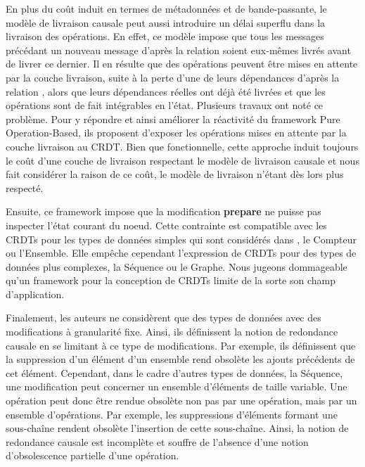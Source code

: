 En plus du coût induit en termes de métadonnées et de bande-passante, le modèle de livraison causale peut aussi introduire un délai superflu dans la livraison des opérations.
En effet, ce modèle impose que tous les messages précédant un nouveau message d'après la relation \hb soient eux-mêmes livrés avant de livrer ce dernier.
Il en résulte que des opérations peuvent être mises en attente par la couche livraison, \eg suite à la perte d'une de leurs dépendances d'après la relation \hb, alors que leurs dépendances réelles ont déjà été livrées et que les opérations sont de fait intégrables en l'état.
Plusieurs travaux \cite{2020-flec-bauwens,2021-improving-reactivity-pure-op-based-crdts-bauwens} ont noté ce problème.
Pour y répondre et ainsi améliorer la réactivité du framework Pure Operation-Based, ils proposent d'exposer les opérations mises en attente par la couche livraison au \ac{CRDT}.
Bien que fonctionnelle, cette approche induit toujours le coût d'une couche de livraison respectant le modèle de livraison causale et nous fait considérer la raison de ce coût, le modèle de livraison n'étant dès lors plus respecté.

Ensuite, ce framework impose que la modification \textbf{prepare} ne puisse pas inspecter l'état courant du noeud.
Cette contrainte est compatible avec les \acp{CRDT} pour les types de données simples qui sont considérés dans \cite{baquero2017pure}, \eg le Compteur ou l'Ensemble.
Elle empêche cependant l'expression de \acp{CRDT} pour des types de données plus complexes, \eg la Séquence ou le Graphe.
Nous jugeons dommageable qu'un framework pour la conception de \acp{CRDT} limite de la sorte son champ d'application.

Finalement, les auteurs ne considèrent que des types de données avec des modifications à granularité fixe.
Ainsi, ils définissent la notion de redondance causale en se limitant à ce type de modifications.
Par exemple, ils définissent que la suppression d'un élément d'un ensemble rend obsolète les ajouts précédents de cet élément.
Cependant, dans le cadre d'autres types de données, \eg la Séquence, une modification peut concerner un ensemble d'éléments de taille variable.
Une opération peut donc être rendue obsolète non pas par une opération, mais par un ensemble d'opérations.
Par exemple, les suppressions d'éléments formant une sous-chaîne rendent obsolète l'insertion de cette sous-chaîne.
Ainsi, la notion de redondance causale est incomplète et souffre de l'absence d'une notion d'obsolescence partielle d'une opération.\\

